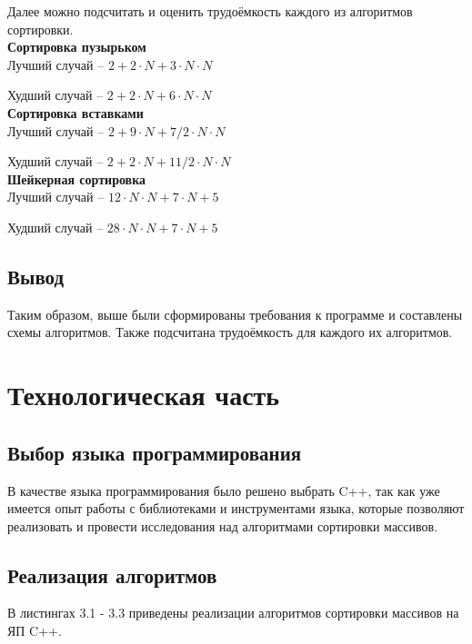 \documentclass[12pt,a4paper]{report}
\begin{document}
Далее можно подсчитать и оценить трудоёмкость каждого из алгоритмов сортировки. \\

\textbf{Сортировка пузырьком} \\

Лучший случай -- $2 + 2 \cdot N + 3 \cdot N \cdot N$

Худший случай -- $2 + 2 \cdot N + 6 \cdot N \cdot N$ \\

\textbf{Сортировка вставками} \\

Лучший случай -- $2 + 9 \cdot N + 7/2 \cdot N \cdot N$

Худший случай -- $2 + 2 \cdot N + 11/2 \cdot N \cdot N$ \\

\textbf{Шейкерная сортировка} \\

Лучший случай -- $12 \cdot N \cdot N + 7 \cdot N + 5$

Худший случай -- $28 \cdot N \cdot N + 7 \cdot N + 5$

\section{Вывод}

Таким образом, выше были сформированы требования к программе и составлены схемы алгоритмов.
Также подсчитана трудоёмкость для каждого их алгоритмов.

\newpage
\chapter{Технологическая часть}

\section{Выбор языка программирования}

В качестве языка программирования было решено выбрать C++, так как уже имеется опыт работы с библиотеками и 
инструментами языка, которые позволяют реализовать и провести исследования над алгоритмами сортировки массивов.

\section{Реализация алгоритмов}

В листингах 3.1 - 3.3 приведены реализации алгоритмов сортировки массивов на ЯП C++. \\
\end{document}
